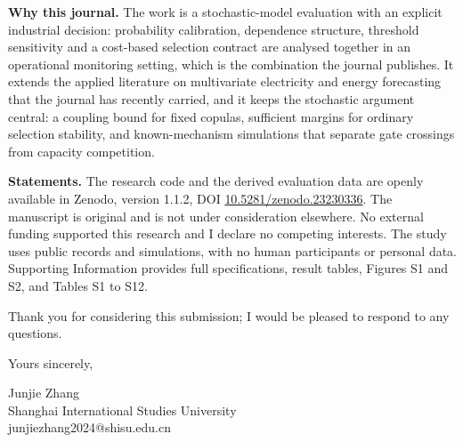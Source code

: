\documentclass[10pt,a4paper]{article}
\begin{document}
\textbf{Why this journal.} The work is a stochastic-model evaluation with an explicit industrial decision: probability calibration, dependence structure, threshold sensitivity and a cost-based selection contract are analysed together in an operational monitoring setting, which is the combination the journal publishes. It extends the applied literature on multivariate electricity and energy forecasting that the journal has recently carried, and it keeps the stochastic argument central: a coupling bound for fixed copulas, sufficient margins for ordinary selection stability, and known-mechanism simulations that separate gate crossings from capacity competition.

\textbf{Statements.} The research code and the derived evaluation data are openly available in Zenodo, version 1.1.2, DOI \href{https://doi.org/10.5281/zenodo.23230336}{10.5281/zenodo.23230336}. The manuscript is original and is not under consideration elsewhere. No external funding supported this research and I declare no competing interests. The study uses public records and simulations, with no human participants or personal data. Supporting Information provides full specifications, result tables, Figures S1 and S2, and Tables S1 to S12.

Thank you for considering this submission; I would be pleased to respond to any questions.

Yours sincerely,

\vspace{8pt}
Junjie Zhang\\
Shanghai International Studies University\\
junjiezhang2024@shisu.edu.cn
\end{document}
